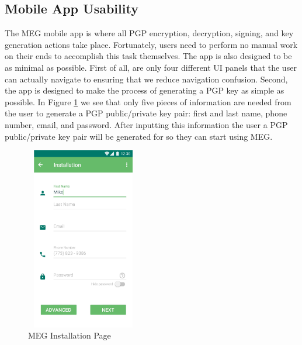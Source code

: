 \documentclass[11pt]{article}
\begin{document}
\subsection{Mobile App Usability}
\par The MEG mobile app is where all PGP encryption, decryption, signing, and key generation actions take place. Fortunately, users need to perform no manual work on their ends to accomplish this task themselves. The app is also designed to be as minimal as possible. First of all, are only four different UI panels that the user can actually navigate to ensuring that we reduce navigation confusion. Second, the app is designed to make the process of generating a PGP key as simple as possible. In Figure \ref{fig:installation} we see that only five pieces of information are needed from the user to generate a PGP public/private key pair: first and last name, phone number, email, and password. After inputting this information the user a PGP public/private key pair will be generated for so they can start using MEG.
\begin{figure}
    \centering
    \includegraphics[height=8cm,width=5cm]{installation-page.jpg}
    \caption{MEG Installation Page}
    \label{fig:installation}
\end{figure}
\end{document}
